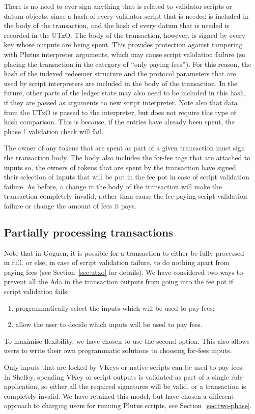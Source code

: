 There is no need to ever sign anything that is related to validator scripts or datum objects,
since a hash of every validator script that is needed
is included in the body of the transaction, and the hash of every datum that is needed
is recorded in the UTxO.
%
The body of the transaction, however, is signed by every key
whose outputs are being spent.
This provides
protection against tampering with Plutus interpreter arguments, which may cause
script validation failure (so placing the transaction in the category of ``only paying fees'').
For this reason, the hash of the indexed redeemer structure and the protocol parameters that are used by
script interpreters are included in the body of the transaction. In the future, other parts of the ledger
state may also need to be included in this hash, if they are passed as
arguments to new script interpreter. Note also that data from the UTxO
is passed to the interpreter, but does not require this type of hash comparison.
This is because, if the entries
have already been spent, the phase 1 validation check will fail.

The owner of any tokens that are spent as part of a given transaction
must sign the transaction body. The body also includes the for-fee tags that are attached to inputs so,
the owners of tokens that are spent by the transaction have
signed their selection of inputs that will be put in the fee pot in case of script validation failure.
As before, a change in the body of the transaction
will make the transaction completely invalid, rather than cause the fee-paying script validation
failure or change the amount of fees it pays.

\subsection{Partially processing transactions}

Note that in Goguen, it is possible for a transaction
to either be fully processed in full, or else, in case of script validation failure,
to do nothing apart from paying fees (see Section~\ref{sec:utxo} for details).
We have considered two ways to prevent all the Ada in the transaction outputs from going into
the fee pot if script validation fails:
%
\begin{enumerate}
  \item programmatically select the inputs which will be used to pay fees;
  \item allow the user to decide which inputs will be used to pay fees.
\end{enumerate}
%
To maximise flexibility, we have chosen to use the second option.
This also allows users to write their own programmatic solutions to choosing for-fees inputs.

Only inputs that are locked by VKeys or native scripts can
be used to pay fees. In Shelley, spending VKey or script outputs is
validated as part of a single rule application, so either all
the required signatures will be valid, or a transaction is completely
invalid. We have retained this model, but have chosen a different approach to
charging users for running Plutus scripts, see
Section~\ref{sec:two-phase}.
